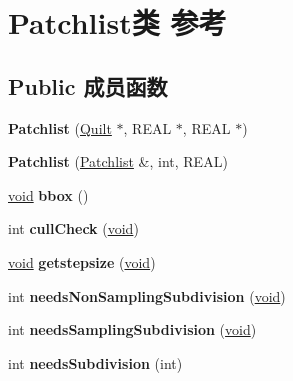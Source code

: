 \hypertarget{class_patchlist}{}\section{Patchlist类 参考}
\label{class_patchlist}
\subsection*{Public 成员函数}
\begin{DoxyCompactItemize}
\item 
\mbox{\label{class_patchlist_aa22a202ff5ca32a09e86521bf5c87d1e}} 
{\bfseries Patchlist} (\hyperlink{class_quilt}{Quilt} $\ast$, R\+E\+AL $\ast$, R\+E\+AL $\ast$)
\item 
\mbox{\label{class_patchlist_a033f9c7b7050cc697eb65adbd5ddd3a6}} 
{\bfseries Patchlist} (\hyperlink{class_patchlist}{Patchlist} \&, int, R\+E\+AL)
\item 
\mbox{\label{class_patchlist_a8e6232c61e87203864f1d0dbadd9d9b4}} 
\hyperlink{interfacevoid}{void} {\bfseries bbox} ()
\item 
\mbox{\label{class_patchlist_ae96aa6e44f2922da93789341952e37d2}} 
int {\bfseries cull\+Check} (\hyperlink{interfacevoid}{void})
\item 
\mbox{\label{class_patchlist_aa75a72b8bbc025a8784bff345eadfd51}} 
\hyperlink{interfacevoid}{void} {\bfseries getstepsize} (\hyperlink{interfacevoid}{void})
\item 
\mbox{\label{class_patchlist_ade76991daafe487d536dac55032bc225}} 
int {\bfseries needs\+Non\+Sampling\+Subdivision} (\hyperlink{interfacevoid}{void})
\item 
\mbox{\label{class_patchlist_ab7a60156edf9122c4cd8502f146ea3ab}} 
int {\bfseries needs\+Sampling\+Subdivision} (\hyperlink{interfacevoid}{void})
\item 
\mbox{\label{class_patchlist_ada0413cb5339ea5e65a0c76e4ad51527}} 
int {\bfseries needs\+Subdivision} (int)
\item 
\mbox{\label{class_patchlist_af8dbd06d3274d2e1f3492ae719099054}} 

\end{DoxyCompactItemize}
